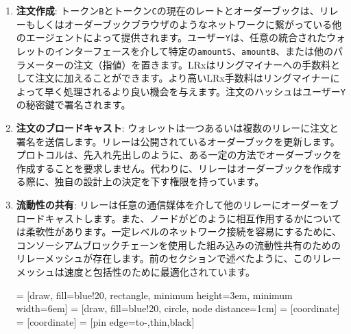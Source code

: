 \documentclass{article}
\makeatletter
\newenvironment{figurehere}
 {\def\@captype{figure}}
 {}
\makeatother
\begin{document}
\begin{multicols}{2}
\begin{enumerate}
\item \textbf{注文作成}: トークン\verb|B|とトークン\verb|C|の現在のレートとオーダーブックは、リレーもしくはオーダーブックブラウザのようなネットワークに繋がっている他のエージェントによって提供されます。ユーザー\verb|Y|は、任意の統合されたウォレットのインターフェースを介して特定の\verb|amountS|、\verb|amountB|、または他のパラメーターの注文（指値）を置きます。LRxはリングマイナーへの手数料として注文に加えることができます。より高いLRx手数料はリングマイナーによって早く処理されるより良い機会を与えます。注文のハッシュはユーザー\verb|Y|の秘密鍵で署名されます。

\item \textbf{注文のブロードキャスト}: ウォレットは一つあるいは複数のリレーに注文と署名を送信します。リレーは公開されているオーダーブックを更新します。プロトコルは、先入れ先出しのように、ある一定の方法でオーダーブックを作成することを要求しません。代わりに、リレーはオーダーブックを作成する際に、独自の設計上の決定を下す権限を持っています。

\item \textbf{流動性の共有}: リレーは任意の通信媒体を介して他のリレーにオーダーをブロードキャストします。また、ノードがどのように相互作用するかについては柔軟性があります。一定レベルのネットワーク接続を容易にするために、コンソーシアムブロックチェーンを使用した組み込みの流動性共有のためのリレーメッシュが存在します。前のセクションで述べたように、このリレーメッシュは速度と包括性のために最適化されています。

\begin{center}
\begin{figurehere}
\centering
{} = [draw, fill=blue!20, rectangle, 
    minimum height=3em, minimum width=6em]
 = [draw, fill=blue!20, circle, node distance=1cm]
 = [coordinate]
 = [coordinate]
 = [pin edge={to-,thin,black}]

\begin{tikzpicture}[
    auto, 
    scale=0.7,
    node distance=2cm,
    >=latex',
    font=\bfseries\footnotesize\sffamily,
    order/.style={
		rectangle,
		scale=0.7,
		rounded corners,
		draw=black, 
		text centered,
		minimum height=12mm,
		minimum width=30mm,
		fill=white
	},
	role/.style={
		circle,
		scale=0.7,
		draw=black, 
		text centered,
		minimum height=12mm,
		minimum width=12mm,
		fill=white
	},
	steps/.style={
		circle,
		scale=0.7,
		draw=black, 
		text centered,
		fill=black,
		text=white
	},
	account/.style={
		circle,
		scale=0.7,
		draw=black, 
		text centered,
		minimum height=16mm,
		minimum width=16mm,
		fill=white
	},
	label/.style={
	  scale=0.7
    }
  ]


\end{tikzpicture}
\end{figurehere}
\end{center}
\end{enumerate}
\end{multicols}
\end{document}

